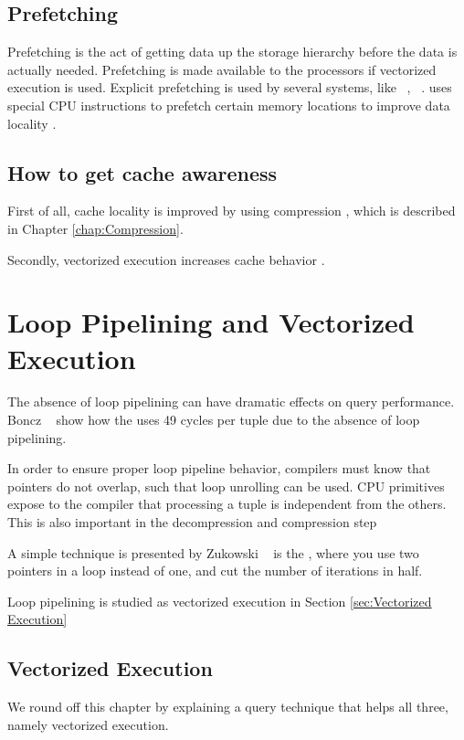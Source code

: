 \subsection{Prefetching}
\label{sub:Prefetching}
Prefetching is the act of getting data up the storage hierarchy before the data is actually needed. Prefetching is made available to the processors if vectorized execution is used. Explicit prefetching is used by several systems, like \ibm~\cite{Raman2013-em}, \monetx~\cite{Boncz2005-wj}. \exasol uses special CPU instructions to prefetch certain memory locations to improve data locality \cite{Exasol2014-xh}.

\subsection{How to get cache awareness}
\label{sub:How to get cache awareness}
First of all, cache locality is improved by using compression \cite{Lemke2010-is}, which is described in Chapter \ref{chap:Compression}.

Secondly, vectorized execution increases cache behavior \cite{Larson2013-mc}.
\section{Loop Pipelining and Vectorized Execution}
\label{sec:Loop Pipelining and Vectorized Execution}
The absence of loop pipelining can have dramatic effects on query performance. Boncz \ea~\cite{Boncz2005-wj} show how the \mysql uses 49 cycles per tuple due to the absence of loop pipelining.

In order to ensure proper loop pipeline behavior, compilers must know that pointers do not overlap, such that loop unrolling can be used. CPU primitives expose to the compiler that processing a tuple is independent from the others. This is also important in the decompression and compression step \cite{Zukowski2006-oz}

A simple technique is presented by Zukowski \ea~\cite{Zukowski2006-oz} is the , where you use two pointers in a loop instead of one, and cut the number of iterations in half.

Loop pipelining is studied as vectorized execution in Section \ref{sec:Vectorized Execution}

\subsection{Vectorized Execution}
\label{sub:Vectorized Execution}
We round off this chapter by explaining a query technique that helps all three, namely vectorized execution.

